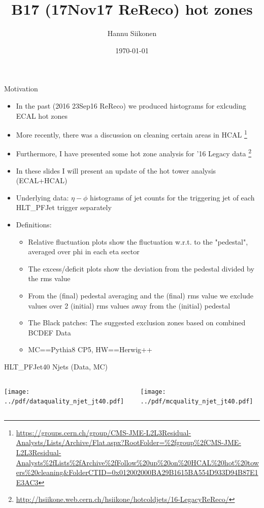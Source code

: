 \documentclass[9pt]{beamer}
\title[B17 (17Nov17 ReReco) hot zones]{B17 (17Nov17 ReReco) hot zones}
\author{Hannu Siikonen}
\institute{Helsinki Institute of Physics \\ \vspace{0.25cm} Instructor Adj.~Prof.~Mikko~Voutilainen}
\date{\today}
\begin{document}
\begin{frame}[t]
\titlepage
\end{frame}

\begin{frame}[t]{Motivation}
\begin{itemize}
 \item In the past (2016 23Sep16 ReReco) we produced histograms for exlcuding ECAL hot zones
 \item More recently, there was a discussion on cleaning certain areas in HCAL \footnote{\url{https://groups.cern.ch/group/CMS-JME-L2L3Residual-Analysts/Lists/Archive/Flat.aspx?RootFolder=\%2fgroup\%2fCMS-JME-L2L3Residual-Analysts\%2fLists\%2fArchive\%2fFollow\%20up\%20on\%20HCAL\%20hot\%20towers\%20cleaning&FolderCTID=0x012002000BA29B1615BA554D933D94B87E1E3AC3}}
 \item Furthermore, I have presented some hot zone analysis for '16 Legacy data \footnote{\url{http://hsiikone.web.cern.ch/hsiikone/hotcoldjets/16-LegacyReReco/}}
 \item In these slides I will present an update of the hot tower analysis (ECAL+HCAL)
 \item Underlying data: $\eta - \phi$ histograms of jet counts for the triggering jet of each HLT\_PFJet\* trigger separately
 \item Definitions:
 \begin{itemize}
 \item Relative fluctuation plots show the fluctuation w.r.t. to the "pedestal", averaged over phi in each eta sector
 \item The excess/deficit plots show the deviation from the pedestal divided by the rms value
 \item From the (final) pedestal averaging and the (final) rms value we exclude values over 2 (initial) rms values away from the (initial) pedestal
 \item The Black patches: The suggested exclusion zones based on combined BCDEF Data
 \item MC==Pythia8 CP5, HW==Herwig++
 \end{itemize}
\end{itemize}
\end{frame}

\begin{frame}[t]{HLT\_PFJet40 Njets (Data, MC)}
\begin{columns}[T]
  \begin{column}{.5\textwidth}
  \texttt{[image: ../pdf/dataquality\_njet\_jt40.pdf]}
  \end{column}
  \begin{column}{.5\textwidth}
  \texttt{[image: ../pdf/mcquality\_njet\_jt40.pdf]}
  \end{column}
\end{columns}
\end{frame}
\end{document}
